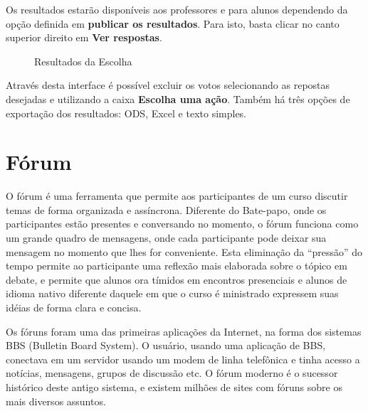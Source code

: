 Os resultados estarão disponíveis aos professores e para alunos dependendo da opção definida em \textbf{publicar os resultados}. Para isto, basta clicar no canto superior direito em \textbf{Ver respostas}. 
\begin{figure}[htbp]
 \begin{center}
  \caption{Resultados da Escolha}
  \label{fig:cap5_19}
 \end{center}
\end{figure}

Através desta interface é possível excluir os votos selecionando as repostas desejadas e utilizando a caixa \textbf{Escolha uma ação}. Também há três opções de exportação dos resultados: ODS, Excel e texto simples.

\section{Fórum}

O fórum é uma ferramenta que permite aos participantes de um curso discutir temas de forma organizada e assíncrona. Diferente do Bate-papo, onde os participantes estão presentes e conversando no momento, o fórum funciona como um grande quadro de mensagens, onde cada participante pode deixar sua mensagem no momento que lhes for conveniente. Esta eliminação da “pressão” do tempo permite ao participante uma reflexão mais elaborada sobre o tópico em debate, e permite que alunos ora tímidos em encontros presenciais e alunos de idioma nativo diferente daquele em que o curso é ministrado expressem suas idéias de forma clara e concisa.

Os fóruns foram uma das primeiras aplicações da Internet, na forma dos sistemas BBS (Bulletin Board System). O usuário, usando uma aplicação de BBS, conectava em um servidor usando um modem de linha telefônica e tinha acesso a notícias, mensagens, grupos de discussão etc. O fórum moderno é o sucessor histórico deste antigo sistema, e existem milhões de sites com fóruns sobre os mais diversos assuntos.


